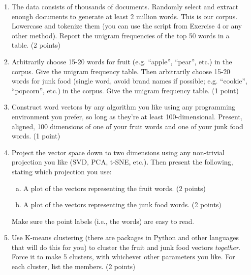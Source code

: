 \documentclass[paper=a4, fontsize=11pt]{scrartcl} %
\numberwithin{equation}{section} %
\numberwithin{figure}{section} %
\numberwithin{table}{section} %
\begin{document}
\begin{enumerate}
\item The data consists of thousands of documents.  Randomly select
  and extract enough documents to generate at least 2 million
  words. This is our corpus.  Lowercase and tokenize them (you can use
  the script from Exercise 4 or any other method).  Report the unigram
  frequencies of the top 50 words in a table. (2 points)
\item Arbitrarily choose 15-20 words for fruit (e.g. ``apple'',
  ``pear'', etc.)  in the corpus. Give the unigram frequency
  table. Then arbitrarily choose 15-20 words for junk food (single
  word, avoid brand names if possible; e.g. ``cookie'', ``popcorn'',
  etc.)  in the corpus.  Give the unigram frequency table. (1 point)
\item Construct word vectors by any algorithm you like using any
  programming environment you prefer, so long as they're at least
  100-dimensional.  Present, aligned, 100 dimensions of one of your
  fruit words and one of your junk food words. (1 point)
\item Project the vector space down to two dimensions using any
  non-trivial projection you like (SVD, PCA, t-SNE, etc.). Then
  present the following, stating which projection you use:
  \begin{enumerate}[(a)]
  \item A plot of the vectors representing the fruit words. (2 points)
  \item A plot of the vectors representing the junk food words. (2 points)
  \end{enumerate}
  Make sure the point labels (i.e., the words) are easy to read.
\item Use K-means clustering (there are packages in Python and other
  languages that will do this for you) to cluster the fruit and junk
  food vectors {\it together}.  Force it to make 5 clusters, with
  whichever other parameters you like.  For each cluster, list the
  members. (2 points)
\end{enumerate}
\end{document}
